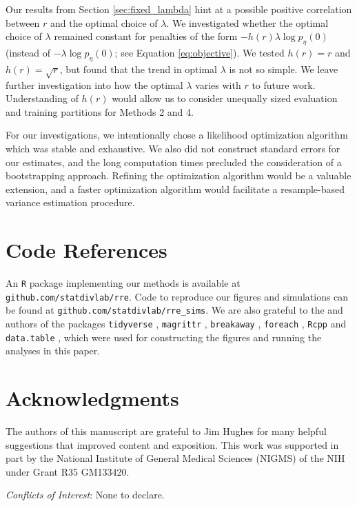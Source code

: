 \documentclass[12pt]{article}
\begin{document}
Our results from Section \ref{sec:fixed_lambda} hint at a possible positive correlation between $r$ and the optimal choice of $\lambda$. We investigated whether the optimal choice of $\lambda$ remained constant for penalties of the form $-h(r)\lambda \log p_{\eta}(0)$ (instead of $-\lambda \log p_{\eta}(0)$; see Equation \eqref{eq:objective}).
We tested $h(r) = r$ and $h(r) = \sqrt{r}$, but found that the trend in optimal $\lambda$ is not so simple. We leave further investigation into how the optimal $\lambda$ varies with $r$ to future work. Understanding of $h(r)$ would allow us to consider unequally sized evaluation and training partitions for Methods 2 and 4.

For our investigations, we intentionally chose a likelihood optimization algorithm which was stable and exhaustive. We also did not construct standard errors for our estimates, and the long computation times precluded the consideration of a bootstrapping approach. Refining the optimization algorithm would be a valuable extension, and a faster optimization algorithm would facilitate a resample-based variance estimation procedure.


\section{Code References}

An \texttt{R} package implementing our methods is available at \texttt{github.com/statdivlab/rre}. Code to reproduce our figures and simulations can be found at \texttt{github.com/statdivlab/rre\_sims}. We are also grateful to the \cite{r_project} and authors of the packages \texttt{tidyverse} \citep{tidyverse}, \texttt{magrittr} \citep{magrittr}, \texttt{breakaway} \citep{breakawaypkg}, \texttt{foreach} \citep{foreach}, \texttt{Rcpp} \citep{Rcpp} and \texttt{data.table} \citep{datatable}, which were used for constructing the figures and running the analyses in this paper.

\section*{Acknowledgments}
The authors of this manuscript are grateful to Jim Hughes for many helpful suggestions that improved content and exposition. This work was supported in part by the National Institute of General Medical Sciences (NIGMS) of the NIH under Grant R35 GM133420.

{\it Conflicts of Interest}: None to declare.


% 
% 

\end{document}
